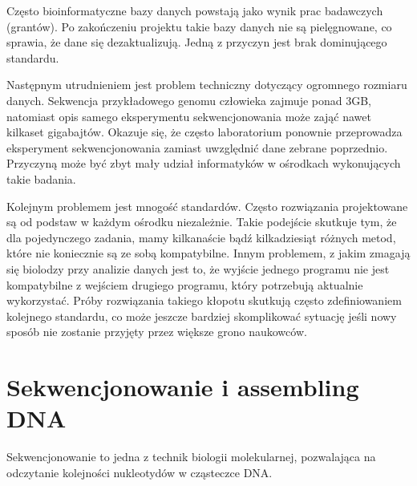 Często bioinformatyczne bazy danych powstają jako wynik prac badawczych (grantów).
Po zakończeniu projektu takie bazy danych nie są pielęgnowane, co sprawia, że dane się dezaktualizują.
Jedną z przyczyn jest brak dominującego standardu.

Następnym utrudnieniem jest problem techniczny dotyczący ogromnego rozmiaru danych.
Sekwencja przykładowego genomu człowieka zajmuje ponad 3GB, natomiast opis samego eksperymentu sekwencjonowania może zająć nawet kilkaset gigabajtów. 
Okazuje się, że często laboratorium ponownie przeprowadza eksperyment sekwencjonowania zamiast uwzględnić dane zebrane poprzednio. Przyczyną może być zbyt mały udział informatyków w ośrodkach wykonujących takie badania.

Kolejnym problemem jest mnogość standardów. 
Często rozwiązania projektowane są od podstaw w każdym ośrodku niezależnie.
Takie podejście skutkuje tym, że dla pojedynczego zadania, mamy kilkanaście bądź kilkadziesiąt różnych metod, które nie koniecznie są ze sobą kompatybilne. 
Innym problemem, z jakim zmagają się biolodzy przy analizie danych jest to, że wyjście jednego programu nie jest kompatybilne z wejściem drugiego programu, który potrzebują aktualnie wykorzystać. 
Próby rozwiązania takiego kłopotu skutkują często zdefiniowaniem kolejnego standardu, co może jeszcze bardziej skomplikować sytuację jeśli nowy sposób nie zostanie przyjęty przez większe grono naukowców.


\section{Sekwencjonowanie i assembling DNA}
Sekwencjonowanie to jedna z technik biologii molekularnej, pozwalająca na odczytanie kolejności nukleotydów w cząsteczce DNA.

